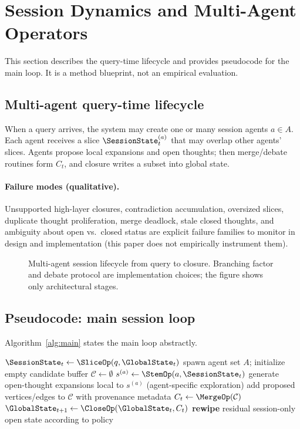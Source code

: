 \section{Session Dynamics and Multi-Agent Operators}
\label{sec:session}

This section describes the query-time lifecycle and provides pseudocode for the main loop.
It is a method blueprint, not an empirical evaluation.

\subsection{Multi-agent query-time lifecycle}
When a query arrives, the system may create one or many session agents $a\in A$.
Each agent receives a slice $\SessionState_t^{(a)}$ that may overlap other agents' slices.
Agents propose local expansions and open thoughts; then merge/debate routines form $C_t$, and closure writes a subset into global state.

\paragraph{Failure modes (qualitative).}
Unsupported high-layer closures, contradiction accumulation, oversized slices, duplicate thought proliferation, merge deadlock, stale closed thoughts, and ambiguity about open vs.\ closed status are explicit failure families to monitor in design and implementation (this paper does not empirically instrument them).

\begin{figure}[t]
  \centering
  
  \caption{Multi-agent session lifecycle from query to closure. Branching factor and debate protocol are implementation choices; the figure shows only architectural stages.}
  \label{fig:pipeline}
\end{figure}

\subsection{Pseudocode: main session loop}
Algorithm~\ref{alg:main} states the main loop abstractly.

\begin{algorithm}[t]
  \caption{Abstract session update for query $q$ at time $t$}
  \label{alg:main}
  \begin{algorithmic}[1]
    \State $\SessionState_t \gets \SliceOp(q, \GlobalState_t)$
    \State spawn agent set $A$; initialize empty candidate buffer $\mathcal{C}\gets\emptyset$
      \State $s^{(a)} \gets \StemOp(a, \SessionState_t)$
      \State generate open-thought expansions local to $s^{(a)}$ (agent-specific exploration)
      \State add proposed vertices/edges to $\mathcal{C}$ with provenance metadata
    \EndFor
    \State $C_t \gets \MergeOp(\mathcal{C})$
    \State $\GlobalState_{t+1} \gets \CloseOp(\GlobalState_t, C_t)$
    \State \textbf{rewipe} residual session-only open state according to policy
  \end{algorithmic}
\end{algorithm}

